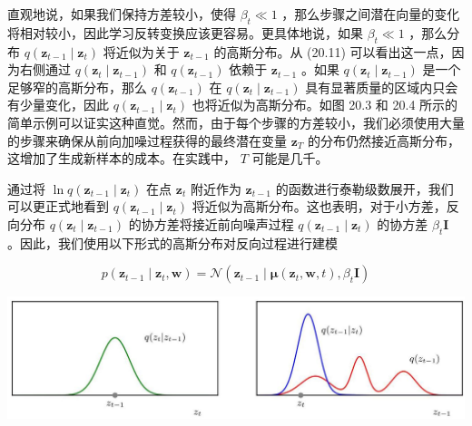 \documentclass[10pt]{article}
\begin{document}
直观地说，如果我们保持方差较小，使得 \({\beta }_{t} \ll  1\) ，那么步骤之间潜在向量的变化将相对较小，因此学习反转变换应该更容易。更具体地说，如果 \({\beta }_{t} \ll  1\) ，那么分布 \(q\left( {{\mathbf{z}}_{t - 1} \mid  {\mathbf{z}}_{t}}\right)\) 将近似为关于 \({\mathbf{z}}_{t - 1}\) 的高斯分布。从 (20.11) 可以看出这一点，因为右侧通过 \(q\left( {{\mathbf{z}}_{t} \mid  {\mathbf{z}}_{t - 1}}\right)\) 和 \(q\left( {\mathbf{z}}_{t - 1}\right)\) 依赖于 \({\mathbf{z}}_{t - 1}\) 。如果 \(q\left( {{\mathbf{z}}_{t} \mid  {\mathbf{z}}_{t - 1}}\right)\) 是一个足够窄的高斯分布，那么 \(q\left( {\mathbf{z}}_{t - 1}\right)\) 在 \(q\left( {{\mathbf{z}}_{t} \mid  {\mathbf{z}}_{t - 1}}\right)\) 具有显著质量的区域内只会有少量变化，因此 \(q\left( {{\mathbf{z}}_{t - 1} \mid  {\mathbf{z}}_{t}}\right)\) 也将近似为高斯分布。如图 20.3 和 20.4 所示的简单示例可以证实这种直觉。然而，由于每个步骤的方差较小，我们必须使用大量的步骤来确保从前向加噪过程获得的最终潜在变量 \({\mathbf{z}}_{T}\) 的分布仍然接近高斯分布，这增加了生成新样本的成本。在实践中， \(T\) 可能是几千。

通过将 \(\ln q\left( {{\mathbf{z}}_{t - 1} \mid  {\mathbf{z}}_{t}}\right)\) 在点 \({\mathbf{z}}_{t}\) 附近作为 \({\mathbf{z}}_{t - 1}\) 的函数进行泰勒级数展开，我们可以更正式地看到 \(q\left( {{\mathbf{z}}_{t - 1} \mid  {\mathbf{z}}_{t}}\right)\) 将近似为高斯分布。这也表明，对于小方差，反向分布 \(q\left( {{\mathbf{z}}_{t} \mid  {\mathbf{z}}_{t - 1}}\right)\) 的协方差将接近前向噪声过程 \(q\left( {{\mathbf{z}}_{t - 1} \mid  {\mathbf{z}}_{t}}\right)\) 的协方差 \({\beta }_{t}\mathbf{I}\) 。因此，我们使用以下形式的高斯分布对反向过程进行建模

\[
p\left( {{\mathbf{z}}_{t - 1} \mid  {\mathbf{z}}_{t},\mathbf{w}}\right)  = \mathcal{N}\left( {{\mathbf{z}}_{t - 1} \mid  \mathbf{\mu }\left( {{\mathbf{z}}_{t},\mathbf{w},t}\right) ,{\beta }_{t}\mathbf{I}}\right)  \tag{20.18}
\]

\begin{center}
\includegraphics[max width=1.0\textwidth]{images/0194e279-9b28-703a-88f4-c3ac21e2010d_605_244_1517_1301_348_0.jpg}
\end{center}
\hspace*{3em} 
\end{document}

